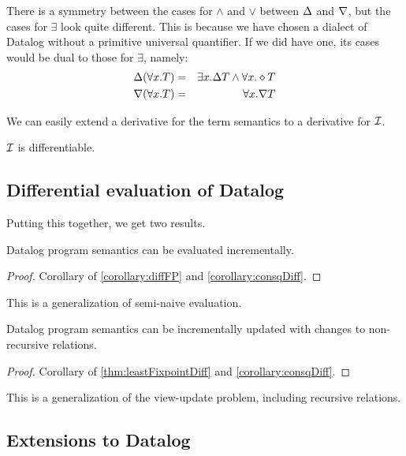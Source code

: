 There is a symmetry between the cases for $\wedge$ and $\vee$ between $\Delta$
and $\nabla$, but the cases for $\exists$ look quite different. 
This is because we have chosen a dialect of Datalog without a primitive universal quantifier.
If we did have one, its cases would be dual to those for $\exists$, namely:
\begin{eqnarray*}
\Delta(\forall x.T) & = & \exists x. \Delta T \wedge \forall x. \diamond T\\
\nabla(\forall x.T) & = & \forall x. \nabla T
\end{eqnarray*}

We can easily extend a derivative for the term semantics to a derivative for $\mathcal{I}$.

\begin{corollary}
\label{corollary:consqDiff}
  $\mathcal{I}$ is differentiable.
\end{corollary}

\subsection{Differential evaluation of Datalog}

Putting this together, we get two results.

\begin{thm}
\label{thm:diffEval}
  Datalog program semantics can be evaluated incrementally.
\end{thm}
\begin{proof}
  Corollary of \ref{corollary:diffFP} and \ref{corollary:consqDiff}.
\end{proof}

This is a generalization of semi-naive evaluation.

\begin{thm}
\label{thm:diffUpdate}
  Datalog program semantics can be incrementally updated with changes to non-recursive relations.
\end{thm}
\begin{proof}
  Corollary of \ref{thm:leastFixpointDiff} and \ref{corollary:consqDiff}.
\end{proof}

This is a generalization of the view-update problem, including recursive relations.

\subsection{Extensions to Datalog}

